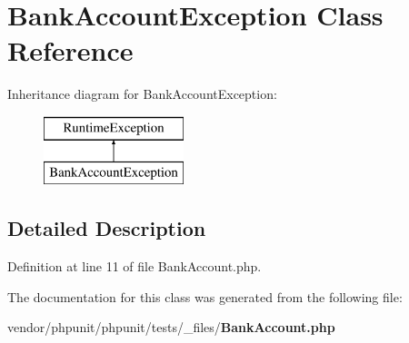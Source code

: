\section{Bank\+Account\+Exception Class Reference}
\label{class_bank_account_exception}
Inheritance diagram for Bank\+Account\+Exception\+:\begin{figure}[H]
\begin{center}
\leavevmode
\includegraphics[height=2.000000cm]{class_bank_account_exception}
\end{center}
\end{figure}


\subsection{Detailed Description}


Definition at line 11 of file Bank\+Account.\+php.



The documentation for this class was generated from the following file\+:\begin{DoxyCompactItemize}
\item 
vendor/phpunit/phpunit/tests/\+\_\+files/{\bf Bank\+Account.\+php}\end{DoxyCompactItemize}
